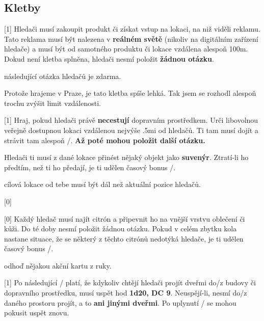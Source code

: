 \subsection{Kletby}\label{kletby}

\begin{cards}
	 Hledači musí zakoupit produkt či získat vstup na lokaci, na niž viděli reklamu. Tato reklama musí být nalezena v \textbf{reálném světě} (nikoliv na digitálním zařízení hledače) a musí být od samotného produktu či lokace vzdálena alespoň 100m. Dokud není kletba splněna, hledači nesmí položit \textbf{žádnou otázku}.

	\cost následující otázka hledačů je zdarma.

	\begin{reasoning}
		Protože hrajeme v Praze, je tato kletba spíše lehká. Tak jsem se rozhodl alespoň trochu zvýšit limit vzdálenosti.
	\end{reasoning}

	 Hraj, pokud hledači právě \textbf{necestují} dopravním prostředkem. Urči libovolnou veřejně dostupnou lokaci vzdálenou nejvýše \dist.5mi od hledačů. Ti tam musí dojít a strávit tam alespoň \timecursetravelvisit/. \textbf{Až poté mohou položit další otázku.}

	Hledači ti musí z dané lokace přinést nějaký objekt jako \textbf{suvenýr}. Ztratí-li ho předtím, než ti ho předají, je ti udělen časový bonus \timecursetravelpenalty/.

	\cost cílová lokace od tebe musí být dál než aktuální pozice hledačů.


	 Každý hledač musí najít citrón a připevnit ho na vnější vrstvu oblečení či kůži. Do té doby nesmí položit žádnou otázku. Pokud v celém zbytku kola nastane situace, že se některý z těchto citrónů nedotýká hledače, je ti udělen časový bonus \timecurselemonpenalty/.

	\cost odhoď nějakou akční kartu z ruky.

	 Po následující \timecursedoorduration/ platí, že kdykoliv chtějí hledači projít dveřmi do/z budovy či dopravního prostředku, musí uspět hod \textbf{1d20, DC 9}. Neuspějí-li, nesmí do/z daného prostoru projít, a to \textbf{ani jinými dveřmi}. Po uplynutí \timecursedoorreattempt/ se mohou pokusit uspět znovu.


\end{cards}
